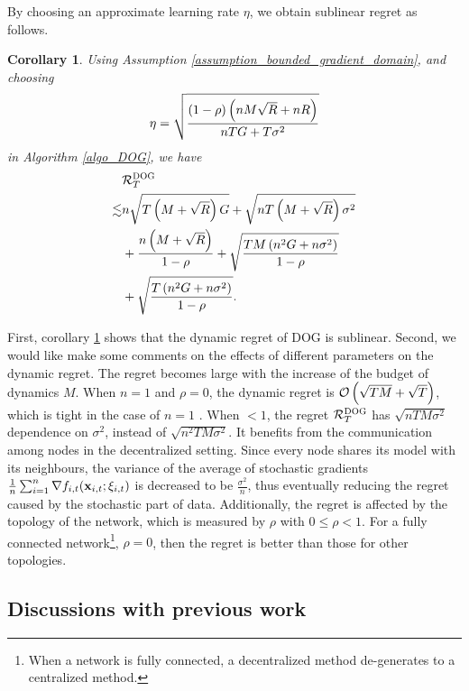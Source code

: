 \documentclass{article}
\newtheorem{Corollary}{\bf{Corollary}}
\begin{document}
By choosing an approximate learning rate $\eta$, we obtain sublinear regret as follows.
\begin{Corollary}
\label{corollary_regret_upper_bound}
Using Assumption \ref{assumption_bounded_gradient_domain}, and choosing 
\begin{align}
\nonumber
\eta = \sqrt{\frac{(1-\rho) \left( nM\sqrt{R} + nR \right)}{ nTG + T\sigma^2 }}
\end{align} in Algorithm \ref{algo_DOG}, we have
\begin{align}
\nonumber
& {\mathcal{R}}_T^{\textsc{DOG}} \\ \nonumber
\lesssim & n \sqrt{T\left( M+\sqrt{R} \right)G}  + \sqrt{n T\left( M+\sqrt{R} \right)\sigma^2} \\ \nonumber
& + \frac{n\left( M+\sqrt{R} \right)}{1-\rho} + \sqrt{\frac{TM\left( n^2G + n \sigma^2 \right)}{1-\rho}} \\ \label{equa_result_corollary}
& + \sqrt{\frac{T\left( n^2G + n \sigma^2 \right)}{1-\rho}}.
\end{align}

\end{Corollary}


First, corollary \ref{corollary_regret_upper_bound} shows that the dynamic regret of DOG is sublinear. Second, we would like make some comments on the effects of different parameters on the dynamic regret. The regret becomes large with the increase of the budget of dynamics $M$. When $n=1$ and $\rho =0$, the dynamic regret is ${\mathcal{O}\left( \sqrt{TM}+\sqrt{T} \right)}$, which is tight in the case of $n=1$ \citep{Zhao:2018wx}. When $ <1$, the regret ${\mathcal{R}}_T^{\textsc{DOG}}$ has $\sqrt{nTM\sigma^2}$ dependence on $\sigma^2$, instead of $\sqrt{n^2TM\sigma^2}$. It benefits from the communication among nodes in the decentralized setting. Since every node shares its model with its neighbours, the variance of the average of stochastic gradients $\frac{1}{n}\sum_{i=1}^n\nabla f_{i,t}({\bf x}_{i,t};\xi_{i,t})$ is decreased to be $\frac{\sigma^2}{n}$, thus eventually reducing the regret caused by the stochastic part of data.   Additionally, the regret is affected by the topology of the network, which is measured by $\rho$ with $0\le \rho < 1$. For a fully connected network\footnote{When a network is fully connected, a decentralized method de-generates to a centralized method.}, $\rho = 0$, then the regret is better than those for other topologies. 




\subsection{Discussions with previous work}
\end{document}
